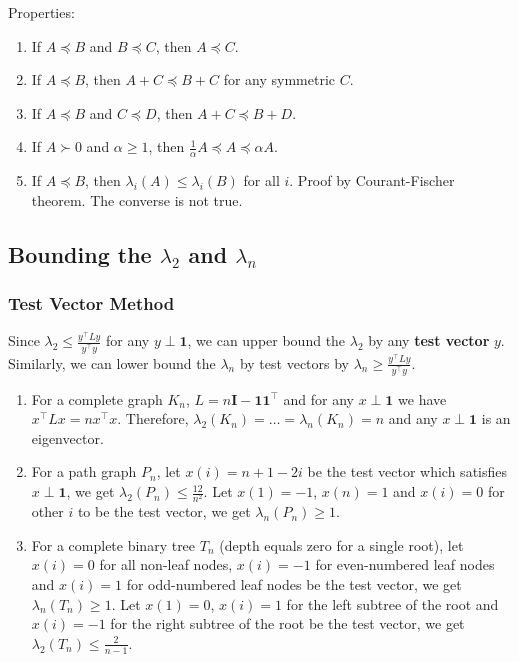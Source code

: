 Properties:
\begin{enumerate}
    \item If $A \preceq B$ and $B \preceq C$, then $A \preceq C$.
    \item If $A \preceq B$, then $A+C \preceq B+C$ for any symmetric $C$.
    \item If $A \preceq B$ and $C \preceq D$, then $A+C \preceq B+D$.
    \item If $A \succ 0$ and $\alpha \ge 1$, then $\frac{1}{\alpha} A \preceq A \preceq \alpha A$.
    \item If $A \preceq B$, then $\lambda_i(A) \le \lambda_i(B)$ for all $i$. Proof by Courant-Fischer theorem. The converse is not true.
\end{enumerate}

\subsection{Bounding the $\lambda_2$ and $\lambda_n$}

\subsubsection{Test Vector Method}
Since $\lambda_2 \le \frac{y^\top L y}{y^\top y}$ for any $y \perp \boldsymbol{1}$, we can upper bound the $\lambda_2$ by any \textbf{test vector} $y$. Similarly, we can lower bound the $\lambda_n$ by test vectors by $\lambda_n \ge \frac{y^\top L y}{y^\top y}$.

\begin{enumerate}
    \item For a complete graph $K_n$, $L = n \boldsymbol{I} - \boldsymbol{1}\boldsymbol{1}^\top$ and for any $x \perp \boldsymbol{1}$ we have $x^\top L x = n x^\top x$. Therefore, $\lambda_2(K_n) = \dots = \lambda_n(K_n) = n$ and any $x \perp \boldsymbol{1}$ is an eigenvector.
    \item For a path graph $P_n$, let $x(i) = n+1 - 2i$ be the test vector which satisfies $x \perp \boldsymbol{1}$, we get $\lambda_2(P_n) \le \frac{12}{n^2}$. Let $x(1)=-1$, $x(n)=1$ and $x(i)=0$ for other $i$ to be the test vector, we get $\lambda_n(P_n) \ge 1$.
    \item For a complete binary tree $T_n$ (depth equals zero for a single root), let $x(i)=0$ for all non-leaf nodes, $x(i)=-1$ for even-numbered leaf nodes and $x(i)=1$ for odd-numbered leaf nodes be the test vector, we get $\lambda_n(T_n) \ge 1$. Let $x(1)=0$, $x(i)=1$ for the left subtree of the root and $x(i)=-1$ for the right subtree of the root be the test vector, we get $\lambda_2(T_n) \le \frac{2}{n-1}$.
\end{enumerate}

